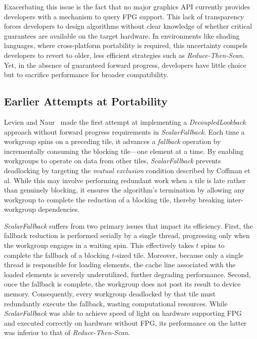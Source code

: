 \documentclass[sigconf]{acmart}
\begin{document}
Exacerbating this issue is the fact that no major graphics API currently provides developers with a mechanism to query FPG support. This lack of transparency forces developers to design algorithms without clear knowledge of whether critical guarantees are available on the target hardware. In environments like shading languages, where cross-platform portability is required, this uncertainty compels developers to revert to older, less efficient strategies such as \emph{Reduce-Then-Scan}. Yet, in the absence of guaranteed forward progress, developers have little choice but to sacrifice performance for broader compatibility.

\subsection{Earlier Attempts at Portability}
Levien and Naur~\cite{Raph2021} made the first attempt at implementing a \emph{DecoupledLookback} approach without forward progress requirements in \emph{ScalarFallback}. Each time a workgroup spins on a preceding tile, it advances a \emph{fallback} operation by incrementally consuming the blocking tile---one element at a time. By enabling workgroups to operate on data from other tiles, \emph{ScalarFallback} prevents deadlocking by targeting the \emph{mutual exclusion} condition described by Coffman et al. While this may involve performing redundant work when a tile is late rather than genuinely blocking, it ensures the algorithm's termination by allowing any workgroup to complete the reduction of a blocking tile, thereby breaking inter-workgroup dependencies.

\emph{ScalarFallback} suffers from two primary issues that impact its efficiency. First, the fallback reduction is performed serially by a single thread, progressing only when the workgroup engages in a waiting spin. This effectively takes $t$ spins to complete the fallback of a blocking $t$-sized tile. Moreover, because only a single thread is responsible for loading elements, the cache line associated with the loaded elements is severely underutilized, further degrading performance. Second, once the fallback is complete, the workgroup does not post its result to device memory. Consequently, every workgroup deadlocked by that tile must redundantly execute the fallback, wasting computational resources. While \emph{ScalarFallback} was able to achieve speed of light on hardware supporting FPG and executed correctly on hardware without FPG, its performance on the latter was inferior to that of \emph{Reduce-Then-Scan}.
\end{document}
